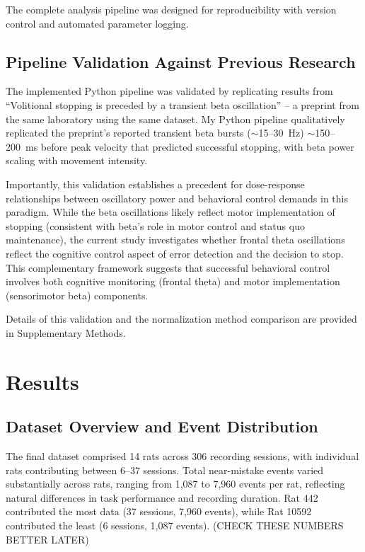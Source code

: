\documentclass[11pt]{article}
\begin{document}
The complete analysis pipeline was designed for reproducibility with version control and automated parameter logging.

\subsection{Pipeline Validation Against Previous Research}

The implemented Python pipeline was validated by replicating results from ``Volitional stopping is preceded by a transient beta oscillation'' \citep{doutel2024volitional} -- a preprint from the same laboratory using the same dataset. My Python pipeline qualitatively replicated the preprint's reported transient beta bursts ($\sim$15--30~Hz) $\sim$150--200~ms before peak velocity that predicted successful stopping, with beta power scaling with movement intensity.

Importantly, this validation establishes a precedent for dose-response relationships between oscillatory power and behavioral control demands in this paradigm. While the beta oscillations likely reflect motor implementation of stopping (consistent with beta's role in motor control and status quo maintenance), the current study investigates whether frontal theta oscillations reflect the cognitive control aspect of error detection and the decision to stop. This complementary framework suggests that successful behavioral control involves both cognitive monitoring (frontal theta) and motor implementation (sensorimotor beta) components.

Details of this validation and the normalization method comparison are provided in Supplementary Methods.

\section{Results}

\subsection{Dataset Overview and Event Distribution}

The final dataset comprised 14 rats across 306 recording sessions, with individual rats contributing between 6--37 sessions. Total near-mistake events varied substantially across rats, ranging from 1,087 to 7,960 events per rat, reflecting natural differences in task performance and recording duration. Rat 442 contributed the most data (37 sessions, 7,960 events), while Rat 10592 contributed the least (6 sessions, 1,087 events). (CHECK THESE NUMBERS BETTER LATER)
\end{document}
